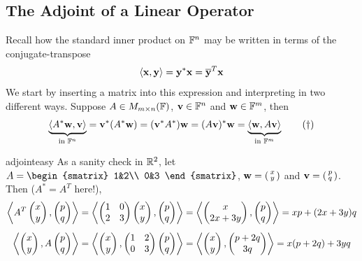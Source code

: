 \begin{exercises}{}{}
\begin{enumerate}
	\end{enumerate}
\end{exercises}

\clearpage


\subsection{The Adjoint of a Linear Operator}

Recall how the standard inner product on $\F^n$ may be written in terms of the conjugate-transpose
\[
	\ip{\vx,\vy}=\vy^*\vx =\cl{\vy}^T\vx
\]
We start by inserting a matrix into this expression and interpreting in two different ways. Suppose $A\in M_{m\times n}(\F)$, $\vv\in\F^n$ and $\vw\in\F^m$, then
\[
	\underbrace{\ip{A^*\vw,\vv}}_{\text{in }\F^n}=\vv^*(A^*\vw)= (\vv^*A^*)\vw =(A\vv)^*\vw=\underbrace{\ip{\vw,A\vv}}_{\text{in }\F^m} \tag{$\dag$}
\]

\begin{example}{}{adjointeasy}
	As a sanity check in $\R^2$, let $A=
	\begin{smatrix}
		1&2\\
		0&3
	\end{smatrix}$,
	$\vw=\stwovec xy$ and $\vv=\stwovec pq$. Then ($A^*=A^T$ here!),
	\begin{gather*}
		\ip{A^T\twovec xy,\twovec pq}
		=\ip{
			\begin{pmatrix}
				1&0\\
				2&3
			\end{pmatrix}
			\twovec xy,\twovec pq
		}
		=\ip{\twovec x{2x+3y},\twovec pq}
		=xp+(2x+3y)q\\[5pt]
		\ip{\twovec xy,A\twovec pq}
		=\ip{\twovec xy,
			\begin{pmatrix}
				1&2\\
				0&3
			\end{pmatrix}
			\twovec pq
		}
		=\ip{\twovec xy,\twovec{p+2q}{3q}}
		=x(p+2q)+3yq
	\end{gather*}
\end{example}

